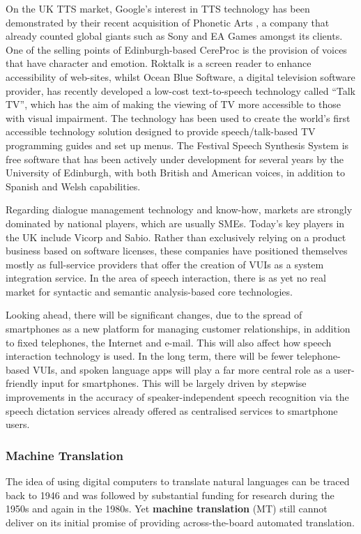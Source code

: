 \documentclass[]{../../metanetpaper}
\begin{document}
\begin{multicols}{2}
On the UK TTS market, Google's interest in TTS technology has been demonstrated by their recent acquisition of Phonetic Arts \cite{PhonArts}, a company that already counted global giants such as Sony and EA Games amongst its clients. One of the selling points of Edinburgh-based CereProc is the provision of voices that have character and emotion. Roktalk is a screen reader to enhance accessibility of web-sites, whilst Ocean Blue Software, a digital television software provider, has recently developed a low-cost text-to-speech technology called ``Talk TV'', which has the aim of making the viewing of TV more accessible to those with visual impairment. The technology has been used to create the world's first accessible technology solution designed to provide speech/talk-based TV programming guides and set up menus. The Festival Speech Synthesis System \cite{festival}  is free software that has been actively under development for several years by the University of Edinburgh, with both British and American voices, in addition to Spanish and Welsh capabilities. 

Regarding dialogue management technology and know-how, markets are strongly dominated by national players, which are usually SMEs. Today's key players in the UK include Vicorp and Sabio. Rather than exclusively relying on a product business based on software licenses, these companies have positioned themselves mostly as full-service providers that offer the creation of VUIs as a system integration service. In the area of speech interaction, there is as yet no real market for syntactic and semantic analysis-based core technologies.

Looking ahead, there will be significant changes, due to the spread of smartphones as a new platform for managing customer relationships, in addition to fixed telephones, the Internet and e-mail. This will also affect how speech interaction technology is used. In the long term, there will be fewer telephone-based VUIs, and spoken language apps will play a far more central role as a user-friendly input for smartphones. This will be largely driven by stepwise improvements in the accuracy of speaker-independent speech recognition via the speech dictation services already offered as centralised services to smartphone users.

\subsubsection{Machine Translation}

The idea of using digital computers to translate natural languages can be traced back to 1946 and was followed by substantial funding for research during the 1950s and again in the 1980s. Yet \textbf{machine translation} (MT) still cannot deliver on its initial promise of providing across-the-board automated translation.


\end{multicols}
\end{document}
